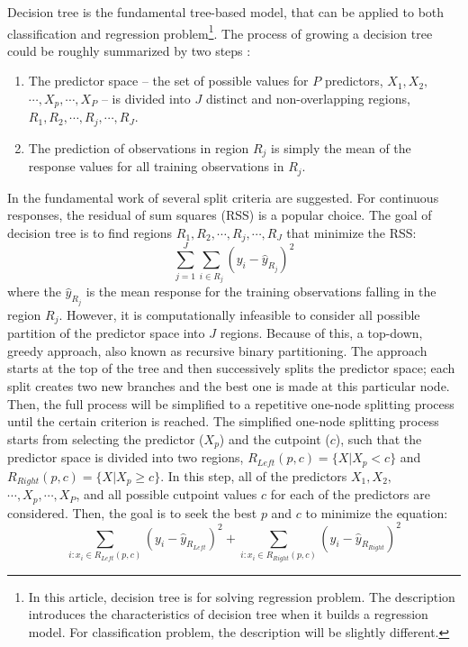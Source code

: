 \documentclass[12pt,a4paper]{article}
\begin{document}
Decision tree is the fundamental tree-based model, that can be applied to both classification and regression problem\footnote{In this article, decision tree is for solving regression problem. The description introduces the characteristics of decision tree when it builds a regression model. For classification problem, the description will be slightly different.}. The process of growing a decision tree could be roughly summarized by two steps \citep{James2017}:
\begin{enumerate}
\item The predictor space -- the set of possible values for $P$ predictors, $X_1, X_2,$ $\cdots, X_p, \cdots, X_P$ -- is divided into $J$ distinct and non-overlapping regions, $R_1, R_2, \cdots, R_j, \cdots, R_J$.
\item The prediction of observations in region $R_j$ is simply the mean of the response values for all training observations in $R_j$. 
\end{enumerate}
In the fundamental work of \citet{Breiman1984} several split criteria are suggested. For continuous responses, the residual of sum squares (RSS) is a popular choice. The goal of decision tree is to find regions $R_1, R_2, \cdots, R_j, \cdots, R_J$ that minimize the RSS:
\begin{equation}
\sum_{j=1}^J \sum_{i \in R_j} (y_i - \hat{y}_{R_j})^2
\end{equation}
where the $\hat{y}_{R_j}$ is the mean response for the training observations falling in the region $R_j$. However, it is computationally infeasible to consider all possible partition of the predictor space into $J$ regions. Because of this, a top-down, greedy approach, also known as recursive binary partitioning. The approach starts at the top of the tree and then successively splits the predictor space; each split creates two new branches and the best one is made at this particular node. Then, the full process will be simplified to a repetitive one-node splitting process until the certain criterion is reached. The simplified one-node splitting process starts from selecting the predictor ($X_p$) and the cutpoint ($c$), such that the predictor space is divided into two regions, $R_{Left}(p,c) = \{ X|X_p < c \}$ and $R_{Right}(p,c) = \{ X|X_p \geq c \}$. In this step, all of the predictors $X_1, X_2,$ $\cdots, X_p, \cdots, X_P$, and all possible cutpoint values $c$ for each of the predictors are considered. Then, the goal is to seek the best $p$ and $c$ to minimize the equation:
\begin{equation}
\sum_{i: x_i \in R_{Left}(p,c)} (y_i - \hat{y}_{R_{Left}})^2 + \sum_{i: x_i \in R_{Right}(p,c)} (y_i - \hat{y}_{R_{Right}})^2
\end{equation}
\end{document}
